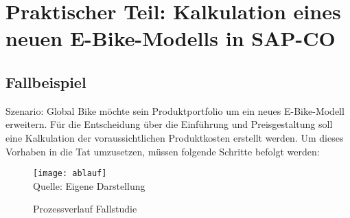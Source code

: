 \newpage
\section{Praktischer Teil: Kalkulation eines neuen E-Bike-Modells in SAP-CO} \label{infos}
\subsection{Fallbeispiel}
Szenario: Global Bike möchte sein Produktportfolio um ein neues E-Bike-Modell erweitern. Für die Entscheidung über die Einführung und Preisgestaltung soll eine Kalkulation der voraussichtlichen Produktkosten erstellt werden.
 Um dieses Vorhaben in die Tat umzusetzen, müssen folgende Schritte befolgt werden:
\\
\begin{figure}[H]
    \caption{Prozessverlauf Fallstudie}\label{fig:process}
    \texttt{[image: ablauf]}
    \\
    Quelle: Eigene Darstellung
\end{figure}
    
